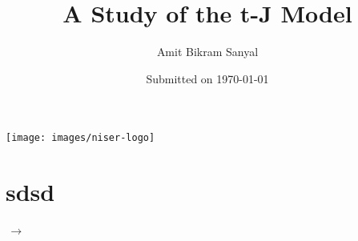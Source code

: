 \documentclass[]{report}
\title{A Study of the t-J Model\vspace{-5mm}}
\author{Amit Bikram Sanyal}
\date{Submitted on \today}
\newcommand{\up}{\fbox{$\uparrow\phantom{\downarrow}$}}%
\newcommand{\updwn}{\fbox{$\mathord\uparrow\downarrow$}}%
\begin{document}
\begin{minipage}{\linewidth}
\maketitle
\end{minipage}
\vfill
\begin{center}
	\texttt{[image: images/niser-logo]}
\end{center}


\newpage
\tableofcontents
\thispagestyle{empty}

\begin{abstract}
\lipsum[1]
\end{abstract}

\chapter{sdsd}
\up\updwn\,$ \longrightarrow $
\end{document}
